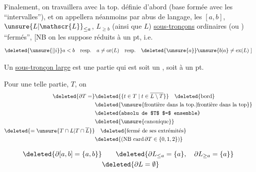 Finalement, on travaillera avec la top. définie d'abord (base formée avec les ``intervalles''), et on appellera néanmoins par abus de langage, les $[a,b]$, $\unsure{L|\mathscr{L}}_{\leq a}$, $L_{\geq b}$ (ainsi que $L$) \uline{sous-tronçons} ordinaires (ou ) ``fermés'', [NB on les suppose  réduits à un pt, i.e.
\[
\deleted{\unsure{[|i}} a<b\quad \text{resp.}\quad a\ne\mathrm{or}(L)\quad \text{resp.}\quad \deleted{\unsure{a}}\unsure{b|a}\ne\mathrm{ex}(L)\;]
\]

Un \uline{sous-tronçon  large} est une  partie qui est soit un , soit  à un pt.

Pour une telle partie, $T$, on
\[
\begin{aligned}
\deleted{\partial T=}&\deleted{\{t\in T\mid t\in \overline{L\setminus T}\}}\quad\text{\deleted{bord}}\\
 &\text{\deleted{\unsure{frontière dans la top.|frontière dans la top}}}\\
 &\text{\deleted{absolu de $T$ $=$ ensemble}}\\
 &\text{\deleted{\unsure{canonique}}}\\
 \deleted{={}\unsure{T\cap L|T\cap\overline{L}}}&\quad\text{\deleted{fermé de ses extrémités}}\\
 &\deleted{(\mathrm{NB}\ \mathrm{card}\,\partial T\in\{0,1,2\})}
\end{aligned}
\]


\[
\begin{aligned}
 \deleted{\partial[a,b]=\{a,b\}}&\qquad \deleted{\partial L_{\leq a}=\{a\},\quad \partial L_{\geq a}=\{a\}}\\
 &\deleted{\partial L=\emptyset}
\end{aligned}
\]
